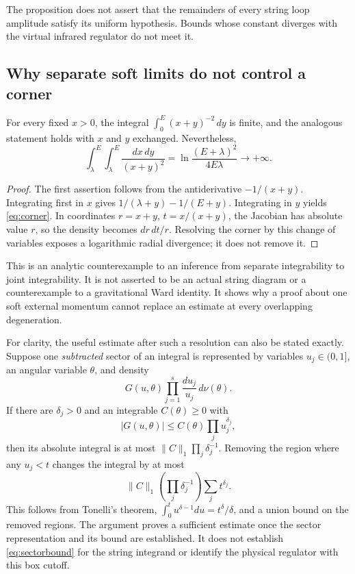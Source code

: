 The proposition does not assert that the remainders of every string loop amplitude satisfy its uniform hypothesis. Bounds whose constant diverges with the virtual infrared regulator do not meet it.

\subsection{Why separate soft limits do not control a corner}

\begin{proposition}\label{prop:softcorner}
For every fixed $x>0$, the integral $\int_0^E(x+y)^{-2}\,dy$ is finite, and the analogous statement holds with $x$ and $y$ exchanged. Nevertheless,
\begin{equation}\label{eq:corner}
 \int_\lambda^E\int_\lambda^E\frac{dx\,dy}{(x+y)^2}
 =\ln\frac{(E+\lambda)^2}{4E\lambda}
 \longrightarrow+\infty.
\end{equation}
\end{proposition}
\begin{proof}
The first assertion follows from the antiderivative $-1/(x+y)$. Integrating first in $x$ gives $1/(\lambda+y)-1/(E+y)$. Integrating in $y$ yields \eqref{eq:corner}. In coordinates $r=x+y$, $t=x/(x+y)$, the Jacobian has absolute value $r$, so the density becomes $dr\,dt/r$. Resolving the corner by this change of variables exposes a logarithmic radial divergence; it does not remove it.
\end{proof}

This is an analytic counterexample to an inference from separate integrability to joint integrability. It is not asserted to be an actual string diagram or a counterexample to a gravitational Ward identity. It shows why a proof about one soft external momentum cannot replace an estimate at every overlapping degeneration.

For clarity, the useful estimate after such a resolution can also be stated exactly. Suppose one \emph{subtracted} sector of an integral is represented by variables $u_j\in(0,1]$, an angular variable $\theta$, and density
\[
 G(u,\theta)\prod_{j=1}^s\frac{du_j}{u_j}\,d\nu(\theta).
\]
If there are $\delta_j>0$ and an integrable $C(\theta)\ge0$ with
\begin{equation}\label{eq:sectorbound}
 |G(u,\theta)|\le C(\theta)\prod_j u_j^{\delta_j},
\end{equation}
then its absolute integral is at most $\|C\|_1\prod_j\delta_j^{-1}$. Removing the region where any $u_j<t$ changes the integral by at most
\begin{equation}\label{eq:sectortail}
 \|C\|_1\left(\prod_j\delta_j^{-1}\right)\sum_jt^{\delta_j}.
\end{equation}
This follows from Tonelli's theorem, $\int_0^t u^{\delta-1}du=t^\delta/\delta$, and a union bound on the removed regions. The argument proves a sufficient estimate once the sector representation and its bound are established. It does not establish \eqref{eq:sectorbound} for the string integrand or identify the physical regulator with this box cutoff.

